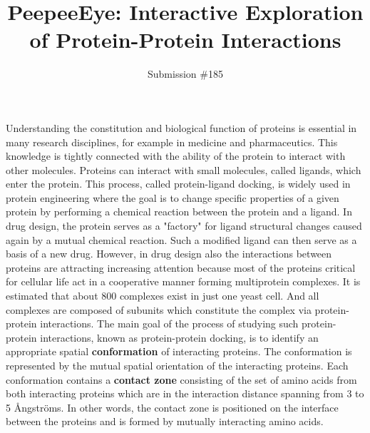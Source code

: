 \documentclass[journal]{vgtc}                %
\title{PeepeeEye: Interactive Exploration of Protein-Protein Interactions}
\author{Submission \#185}
\begin{document}


\maketitle
Understanding the constitution and biological function of proteins is essential in many research disciplines, for example in medicine and pharmaceutics.
This knowledge is tightly connected with the ability of the protein to interact with other molecules.
Proteins can interact with small molecules, called ligands, which enter the protein.
This process, called protein-ligand docking, is widely used in protein engineering where the goal is to change specific properties of a given protein by performing a chemical reaction between the protein and a ligand.
In drug design, the protein serves as a "factory" for ligand structural changes caused again by a mutual chemical reaction. 
Such a modified ligand can then serve as a basis of a new drug. 
However, in drug design also the interactions between proteins are attracting increasing attention because most of the proteins critical for cellular life act in a cooperative manner forming multiprotein complexes. 
It is estimated that about 800 complexes exist in just one yeast cell. 
And all complexes are composed of subunits which constitute the complex via protein-protein interactions.
The main goal of the process of studying such protein-protein interactions, known as protein-protein docking, is to identify an appropriate spatial \textbf{conformation} of interacting proteins.
The conformation is represented by the mutual spatial orientation of the interacting proteins.
Each conformation contains a \textbf{contact zone} consisting of the set of amino acids from both interacting proteins which are in the interaction distance spanning from 3 to 5 \AA ngstr\"{o}ms.
In other words, the contact zone is positioned on the interface between the proteins and is formed by mutually interacting amino acids.
\end{document}
